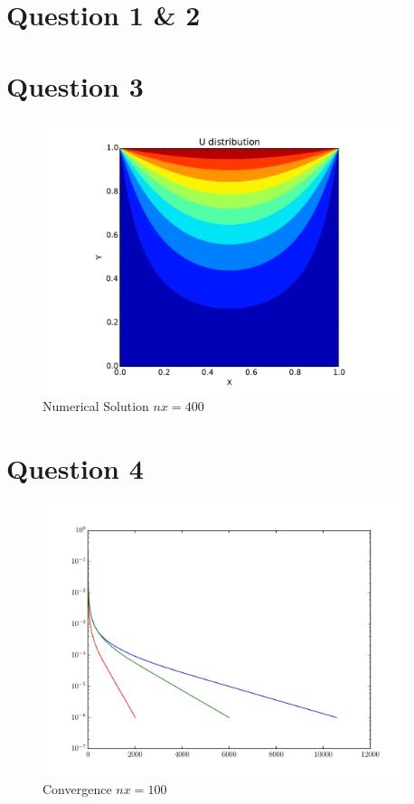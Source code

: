 \documentclass[letterpaper,12pt,]{article}
\begin{document}


\section*{Question 1 \& 2}



\section*{Question 3}

\begin{figure}[!h]
    \centering
    \includegraphics[width = 0.95\textwidth]{./Figures/U400.pdf}
    \caption{Numerical Solution $nx = 400$}
    \label{fig:u400}
\end{figure}


\newpage
\section*{Question 4}

\begin{figure}[!h]
    \centering
    \includegraphics[width = 0.95\textwidth]{./Figures/Conv100.pdf}
    \caption{Convergence $nx = 100$}
    \label{fig:u100}
\end{figure}
\end{document}
